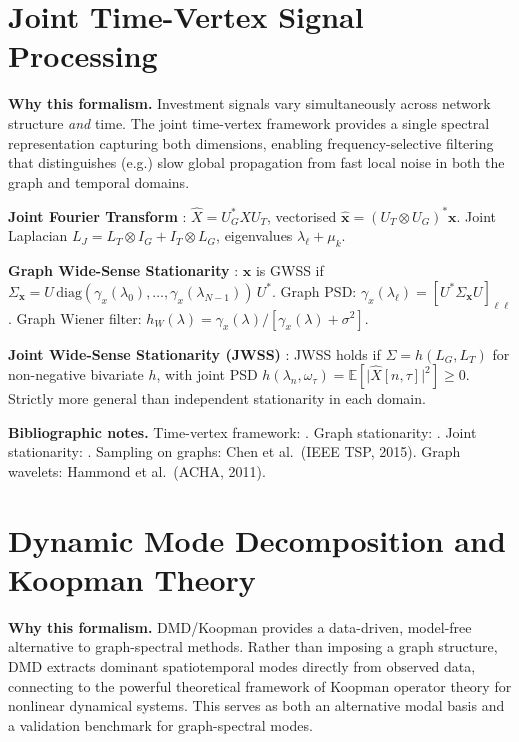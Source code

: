 \documentclass[11pt,a4paper]{article}
\theoremstyle{definition}
\newcommand{\E}{\mathbb{E}}
\newcommand{\bx}{\bm{x}}
\begin{document}
\begin{appendices}
\section{Joint Time-Vertex Signal Processing}
\label{app:time_vertex}

\textbf{Why this formalism.} Investment signals vary simultaneously across network structure \emph{and} time. The joint time-vertex framework provides a single spectral representation capturing both dimensions, enabling frequency-selective filtering that distinguishes (e.g.) slow global propagation from fast local noise in both the graph and temporal domains.

\textbf{Joint Fourier Transform} \citep{grassi2018time}: $\hat{X} = U_G^* X U_T$, vectorised $\hat{\bx} = (U_T \otimes U_G)^*\bx$. Joint Laplacian $L_J = L_T \otimes I_G + I_T \otimes L_G$, eigenvalues $\lambda_\ell + \mu_k$.

\textbf{Graph Wide-Sense Stationarity} \citep{perraudin2017stationary}: $\bx$ is GWSS if $\Sigma_{\bx} = U\,\mathrm{diag}(\gamma_x(\lambda_0), \ldots, \gamma_x(\lambda_{N-1}))\,U^*$. Graph PSD: $\gamma_x(\lambda_\ell) = [U^*\Sigma_{\bx} U]_{\ell\ell}$. Graph Wiener filter: $h_W(\lambda) = \gamma_x(\lambda)/[\gamma_x(\lambda) + \sigma^2]$.

\textbf{Joint Wide-Sense Stationarity (JWSS)} \citep{loukas2019stationary}: JWSS holds if $\Sigma = h(L_G, L_T)$ for non-negative bivariate $h$, with joint PSD $h(\lambda_n, \omega_\tau) = \E[\lvert\hat{X}[n,\tau]\rvert^2] \geq 0$. Strictly more general than independent stationarity in each domain.

\textbf{Bibliographic notes.} Time-vertex framework: \citet{grassi2018time}. Graph stationarity: \citet{perraudin2017stationary}. Joint stationarity: \citet{loukas2019stationary}. Sampling on graphs: Chen et al.\ (IEEE TSP, 2015). Graph wavelets: Hammond et al.\ (ACHA, 2011).


\section{Dynamic Mode Decomposition and Koopman Theory}
\label{app:dmd}

\textbf{Why this formalism.} DMD/Koopman provides a data-driven, model-free alternative to graph-spectral methods. Rather than imposing a graph structure, DMD extracts dominant spatiotemporal modes directly from observed data, connecting to the powerful theoretical framework of Koopman operator theory for nonlinear dynamical systems. This serves as both an alternative modal basis and a validation benchmark for graph-spectral modes.


\end{appendices}
\end{document}
